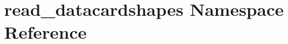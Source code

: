 \hypertarget{namespaceread__datacardshapes}{
\section{read\_\-datacardshapes Namespace Reference}
\label{namespaceread__datacardshapes}
}
